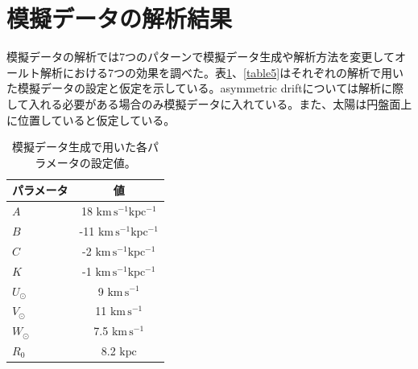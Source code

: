 
\section{模擬データの解析結果}
模擬データの解析では7つのパターンで模擬データ生成や解析方法を変更してオールト解析における7つの効果を調べた。表\ref{table4}、\ref{table5}はそれぞれの解析で用いた模擬データの設定と仮定を示している。asymmetric driftについては解析に際して入れる必要がある場合のみ模擬データに入れている。また、太陽は円盤面上に位置していると仮定している。

\begin{table}
\begin{center}
\begin{tabular}{l|c} \hline
 \rowcolor{LightCyan}
 パラメータ & 値\\
 \hline
 $A$ & 18 $\mathrm{km\,s^{-1} kpc^{-1}}$\\
 \hline
 $B$ & -11 $\mathrm{km\,s^{-1} kpc^{-1}}$\\
 \hline
 $C$ & -2 $\mathrm{km\,s^{-1} kpc^{-1}}$\\
 \hline
 $K$ & -1 $\mathrm{km\,s^{-1} kpc^{-1}}$\\
 \hline
 $U_{\odot}$ & 9 $\mathrm{km\,s^{-1}}$\\
 \hline
 $V_{\odot}$ & 11 $\mathrm{km\,s^{-1}}$\\
 \hline
 $W_{\odot}$ & 7.5 $\mathrm{km\,s^{-1}}$\\
 \hline
 $R_0$ & 8.2 $\mathrm{kpc}$\\
 \hline
\end{tabular}
\vspace{3mm}
\caption{模擬データ生成で用いた各パラメータの設定値。}
\label{table4}
\end{center}
\end{table}



